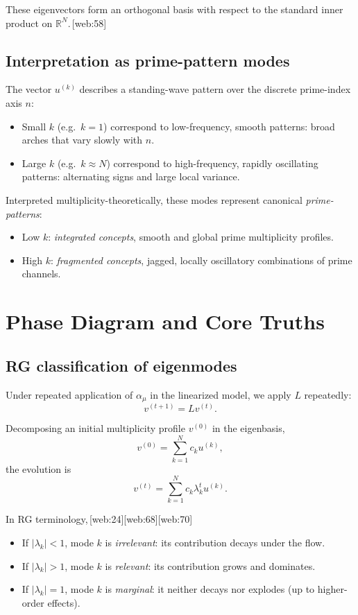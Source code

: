 \documentclass[11pt]{article}
\begin{document}
\noindent These eigenvectors form an orthogonal basis with respect to the standard inner product on \(\mathbb{R}^N\).\,[web:58]

\subsection{Interpretation as prime-pattern modes}

The vector \(u^{(k)}\) describes a standing-wave pattern over the discrete prime-index axis \(n\):

\begin{itemize}
  \item Small \(k\) (e.g.\ \(k=1\)) correspond to low-frequency, smooth patterns: broad arches that vary slowly with \(n\).
  \item Large \(k\) (e.g.\ \(k \approx N\)) correspond to high-frequency, rapidly oscillating patterns: alternating signs and large local variance.
\end{itemize}

Interpreted multiplicity-theoretically, these modes represent canonical \emph{prime-patterns}:

\begin{itemize}
  \item Low \(k\): \emph{integrated concepts}, smooth and global prime multiplicity profiles.
  \item High \(k\): \emph{fragmented concepts}, jagged, locally oscillatory combinations of prime channels.
\end{itemize}

\section{Phase Diagram and Core Truths}

\subsection{RG classification of eigenmodes}

Under repeated application of \(\alpha_\mu\) in the linearized model, we apply \(L\) repeatedly:
\[
v^{(t+1)} = L v^{(t)}.
\]

Decomposing an initial multiplicity profile \(v^{(0)}\) in the eigenbasis,
\[
v^{(0)} = \sum_{k=1}^N c_k u^{(k)},
\]
the evolution is
\[
v^{(t)} = \sum_{k=1}^N c_k \lambda_k^t u^{(k)}.
\]

In RG terminology,\,[web:24][web:68][web:70]
\begin{itemize}
  \item If \(|\lambda_k| < 1\), mode \(k\) is \emph{irrelevant}: its contribution decays under the flow.
  \item If \(|\lambda_k| > 1\), mode \(k\) is \emph{relevant}: its contribution grows and dominates.
  \item If \(|\lambda_k| = 1\), mode \(k\) is \emph{marginal}: it neither decays nor explodes (up to higher-order effects).
\end{itemize}
\end{document}
